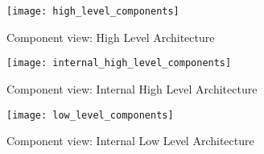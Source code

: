 \begin{sidewaysfigure}
\centering
\texttt{[image: high\_level\_components]}
\caption{Component view: High Level Architecture}
\label{fig:h_l_comp}
\end{sidewaysfigure}

\pagebreak

\begin{sidewaysfigure}
\centering
\texttt{[image: internal\_high\_level\_components]}
\caption{Component view: Internal High Level Architecture}
\label{fig:i_h_l_comp}
\end{sidewaysfigure}

\pagebreak

\begin{sidewaysfigure}
\centering
\texttt{[image: low\_level\_components]}
\caption{Component view: Internal Low Level Architecture}
\label{fig:i_l_l_comp}
\end{sidewaysfigure}

\pagebreak
